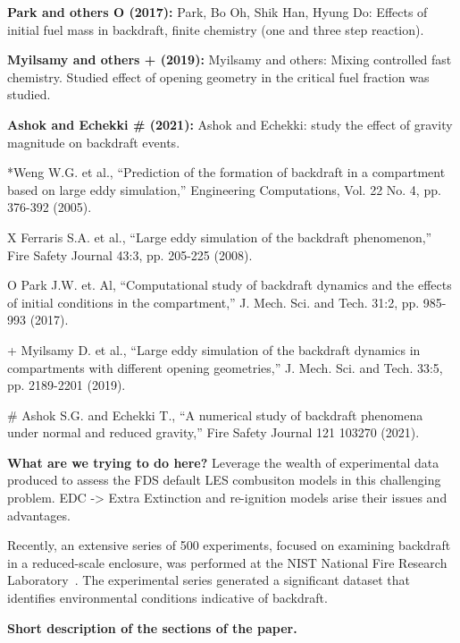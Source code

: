 \documentclass[12pt,letterpaper]{article}
\begin{document}
\begin{flushleft}
\textbf{Park and others O (2017):} Park, Bo Oh, Shik Han, Hyung Do: Effects of initial fuel mass in backdraft, finite chemistry (one and three step reaction).


\textbf{Myilsamy and others + (2019):} Myilsamy and others: Mixing controlled fast chemistry. Studied effect of opening geometry in the critical fuel fraction was studied.


\textbf{Ashok and Echekki # (2021):} Ashok and Echekki: study the effect of gravity magnitude on backdraft events. 

*Weng W.G. et al., “Prediction of the formation of backdraft in a compartment based on large eddy simulation,” Engineering Computations, Vol. 22 No. 4, pp. 376-392 (2005).

X Ferraris S.A. et al., “Large eddy simulation of the backdraft phenomenon,” Fire Safety Journal 43:3, pp. 205-225 (2008).

O Park J.W. et. Al, “Computational study of backdraft dynamics and the effects of initial conditions in the compartment,” J. Mech. Sci. and Tech. 31:2, pp. 985-993 (2017).

+ Myilsamy D. et al., “Large eddy simulation of the backdraft dynamics in compartments with different opening geometries,” J. Mech. Sci. and Tech. 33:5, pp. 2189-2201 (2019).

# Ashok S.G. and Echekki T., “A numerical study of backdraft phenomena under normal and reduced gravity,” Fire Safety Journal 121 103270 (2021).


\textbf{What are we trying to do here?} Leverage the wealth of experimental data produced to assess the FDS default LES combusiton models in this challenging problem.  EDC -> Extra Extinction and re-ignition models arise their issues and advantages. 

Recently, an extensive series of 500 experiments, focused on examining backdraft in a reduced-scale enclosure, was performed at the NIST National Fire Research Laboratory~\cite{Falkenstein2022}. The experimental series generated a significant dataset that identifies environmental conditions indicative of backdraft.  

\textbf{Short description of the sections of the paper.}


\end{flushleft}
\end{document}
